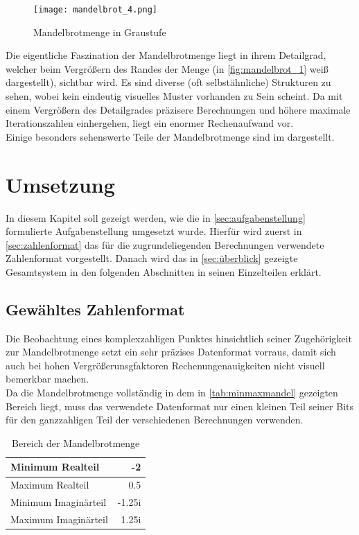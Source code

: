 \documentclass[a4paper,12pt,onesided]{report}
\begin{document}
\begin{figure}[H]
	\centering
	\texttt{[image: mandelbrot\_4.png]}
	\caption{Mandelbrotmenge in Graustufe}
	\label{fig:mandelbrot_1}
\end{figure}

Die eigentliche Faszination der Mandelbrotmenge liegt in ihrem Detailgrad, welcher beim Vergrößern des Randes der Menge (in \autoref{fig:mandelbrot_1} weiß dargestellt), sichtbar wird. Es sind diverse (oft selbstähnliche) Strukturen zu sehen, wobei kein eindeutig visuelles Muster vorhanden zu Sein scheint. Da mit einem Vergrößern des Detailgrades präzisere Berechnungen und höhere maximale Iterationszahlen einhergehen, liegt ein enormer Rechenaufwand vor.\\
Einige besonders sehenswerte Teile der Mandelbrotmenge sind im %
dargestellt.

\chapter{Umsetzung}
In diesem Kapitel soll gezeigt werden, wie die in \autoref{sec:aufgabenstellung} formulierte Aufgabenstellung umgesetzt wurde. Hierfür wird zuerst in \autoref{sec:zahlenformat} das für die zugrundeliegenden Berechnungen verwendete Zahlenformat vorgestellt. Danach wird das in \autoref{sec:überblick} gezeigte Gesamtsystem in den folgenden Abschnitten in seinen Einzelteilen erklärt.

\section{Gewähltes Zahlenformat}
\label{sec:zahlenformat}
Die Beobachtung eines komplexzahligen Punktes hinsichtlich seiner Zugehörigkeit zur Mandelbrotmenge setzt ein sehr präzises Datenformat vorraus, damit sich auch bei hohen Vergrößerunsgfaktoren Rechenungenauigkeiten nicht visuell bemerkbar machen.\\
Da die Mandelbrotmenge vollständig in dem in \autoref{tab:minmaxmandel} gezeigten Bereich liegt, muss das verwendete Datenformat nur einen kleinen Teil seiner Bits für den ganzzahligen Teil der verschiedenen Berechnungen verwenden. \\

\begin{table}[H]
	\centering
	\begin{tabular}{|l|r|}	
		\hline
		Minimum Realteil & -2 \\ \hline
		Maximum Realteil & 0.5 \\ \hline
		Minimum Imaginärteil & -1.25i \\ \hline
		Maximum Imaginärteil & 1.25i \\ \hline
	\end{tabular}
	\caption{Bereich der Mandelbrotmenge}
	\label{tab:minmaxmandel}
\end{table}
\end{document}
